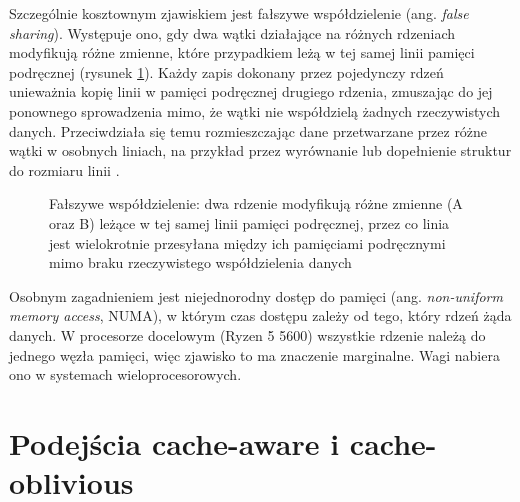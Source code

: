 \documentclass[a4paper,12pt]{book} %
\begin{document}
Szczególnie kosztownym zjawiskiem jest fałszywe współdzielenie (ang. \emph{false sharing}). Występuje ono, gdy dwa wątki działające na różnych rdzeniach modyfikują różne zmienne, które przypadkiem leżą w tej samej linii pamięci podręcznej (rysunek \ref{rys:falsesharing}). Każdy zapis dokonany przez pojedynczy rdzeń unieważnia kopię linii w pamięci podręcznej drugiego rdzenia, zmuszając do jej ponownego sprowadzenia mimo, że wątki nie współdzielą żadnych rzeczywistych danych. Przeciwdziała się temu rozmieszczając dane przetwarzane przez różne wątki w osobnych liniach, na przykład przez wyrównanie lub dopełnienie struktur do rozmiaru linii \cite{drepper2007memory}.

\begin{figure}[t!]
\centering
{}
\caption{Fałszywe współdzielenie: dwa rdzenie modyfikują różne zmienne (A oraz B) leżące w tej samej linii pamięci podręcznej, przez co linia jest wielokrotnie przesyłana między ich pamięciami podręcznymi mimo braku rzeczywistego współdzielenia danych}
\label{rys:falsesharing}
\end{figure}

Osobnym zagadnieniem jest niejednorodny dostęp do pamięci (ang. \emph{non-uniform memory access}, NUMA), w którym czas dostępu zależy od tego, który rdzeń żąda danych. W procesorze docelowym (Ryzen 5 5600) wszystkie rdzenie należą do jednego węzła pamięci, więc zjawisko to ma znaczenie marginalne. Wagi nabiera ono w systemach wieloprocesorowych.

\section{Podejścia cache-aware i cache-oblivious}
\label{sec:aware-oblivious}
\end{document}
